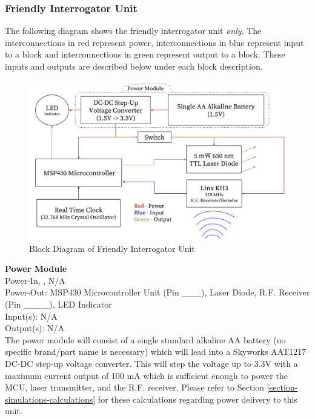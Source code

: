\documentclass[letterpaper,10pt]{article}
\begin{document}
\begin{spacing}{1.15}
\subsubsection{Friendly Interrogator Unit} \label{section-friendly-interrogator-design}
The following diagram shows the friendly interrogator unit \textit{only}. The interconnections in red represent power, interconnections in blue represent input to a block and interconnections in green represent output to a block. These inputs and outputs are described below under each block description.
\begin{figure} [H]
\centering
\includegraphics[scale=0.48]{Friendly_Interrogator_Block_Diagram.png}
\caption{Block Diagram of Friendly Interrogator Unit\label{fig:friendly-interrogator-block}}
\end{figure}

\normalsize\textbf{Power Module} \\
Power-In, ,  N/A \\
Power-Out: MSP430 Microcontroller Unit (Pin \_\_\_), Laser Diode, R.F. Receiver (Pin \_\_\_\_), LED Indicator \\
Input(s): N/A\\
Output(s): N/A\\

The power module will consist of a single standard alkaline AA battery (no specific brand/part name is necessary) which will lead into a Skyworks AAT1217 DC-DC step-up voltage converter. This will step the voltage up to 3.3V with a maximum current output of 100 mA which is sufficient enough to power the MCU, laser transmitter, and the R.F. receiver. Please refer to  Section \ref{section-simulations-calculations} for these calculations regarding power delivery to this unit. 


\end{spacing}
\end{document}
